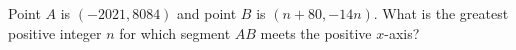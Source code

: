 Point $A$ is $(-2021,8084)$ and point $B$ is $(n+80,-14n)$. What is the greatest positive integer $n$ for which segment $AB$ meets the positive $x$-axis?
